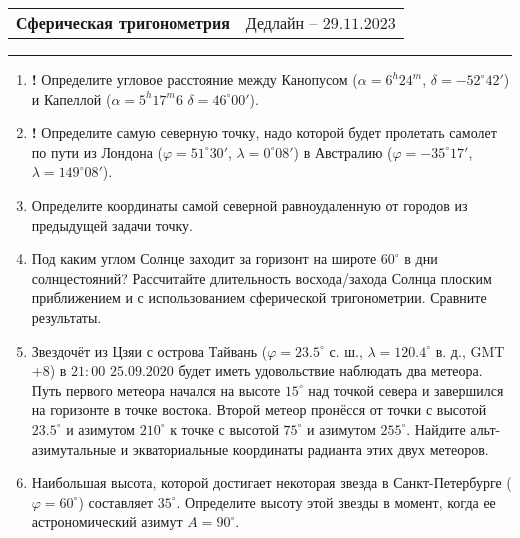 \documentclass[12pt]{article}
\begin{document}
\begin{tabularx}{\textwidth}{Xr}
{\Large \textbf{Сферическая тригонометрия}} & Дедлайн -- $29.11.2023$ \\
\end{tabularx}
\noindent\rule{\textwidth}{0.4pt}
\begin{enumerate}
    \item \textbf{!} Определите угловое расстояние между Канопусом ($\alpha =  6^h24^m$, $\delta = -52^{\circ}42'$) и Капеллой ($\alpha = 5^h17^m$6 $\delta = 46^{\circ}00'$).
    \item \textbf{!} Определите самую северную точку, надо которой будет пролетать самолет по пути из Лондона ($\varphi = 51^{\circ}30'$, $\lambda = 0^{\circ}08'$) в Австралию ($\varphi = -35^{\circ}17'$, $\lambda = 149^{\circ}08'$). 
    \item Определите координаты самой северной равноудаленную от городов из предыдущей задачи точку.
    \item Под каким углом Солнце заходит за горизонт на широте $60^{\circ}$ в дни солнцестояний? Рассчитайте длительность восхода/захода Солнца плоским приближением и с использованием сферической тригонометрии. Сравните результаты.
    \item Звездочёт из Цзяи с острова Тайвань ($\varphi = 23.5^{\circ}$ с. ш., $\lambda = 120.4^{\circ}$ в. д., GMT$+8$) в $21:00$ $25.09.2020$ будет иметь удовольствие наблюдать два метеора. Путь первого метеора начался на высоте $15^{\circ}$ над точкой севера и завершился на горизонте в точке востока. Второй метеор пронёсся от точки с высотой $23.5^{\circ}$ и азимутом $210^{\circ}$ к точке с высотой $75^{\circ}$ и азимутом $255^{\circ}$.
    Найдите альт-азимутальные и экваториальные координаты радианта этих двух метеоров.
    \item Наибольшая высота, которой достигает некоторая звезда в Санкт-Петербурге ($\varphi = 60^{\circ}$) составляет $35^{\circ}$. Определите высоту этой звезды в момент, когда ее астрономический азимут $A = 90^{\circ}$.
\end{enumerate}
\end{document}
